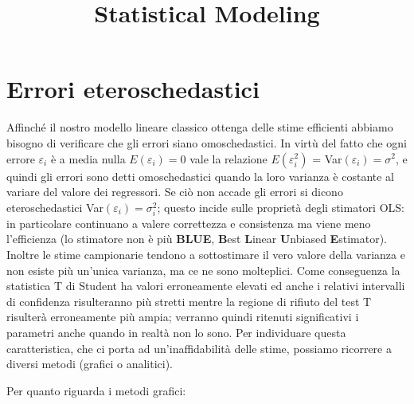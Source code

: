 \documentclass[a4page, 11pt]{article} %
\title{Statistical Modeling}
\author{}
\date{}
\begin{document}
\maketitle

\section{Errori eteroschedastici}
Affinché il nostro modello lineare classico ottenga delle stime efficienti abbiamo bisogno di verificare che gli errori siano omoschedastici. 
In virtù del fatto che ogni errore $\varepsilon_i$ è a media nulla $E(\varepsilon_i) = 0$ vale la relazione $E(\varepsilon_i^2)$ = Var$(\varepsilon_i) = \sigma^2$, e quindi gli errori sono detti omoschedastici quando la loro varianza è costante al variare del valore dei regressori.
Se ciò non accade gli errori si dicono eteroschedastici Var$(\varepsilon_i) = \sigma_i^2$; questo incide sulle proprietà degli stimatori OLS: in particolare continuano a valere correttezza e consistenza ma viene meno l’efficienza (lo stimatore non è più \textbf{BLUE}, \textbf{B}est \textbf{L}inear \textbf{U}nbiased \textbf{E}stimator). 
Inoltre le stime campionarie tendono a sottostimare il vero valore della varianza e non esiste più un’unica varianza, ma ce ne sono molteplici. 
Come conseguenza la statistica T di Student ha valori erroneamente elevati ed anche i relativi intervalli di confidenza risulteranno più stretti mentre la regione di rifiuto del test T risulterà erroneamente più ampia; verranno quindi ritenuti significativi i parametri anche quando in realtà non lo sono. 
Per individuare questa caratteristica, che ci porta ad un’inaffidabilità delle stime, possiamo ricorrere a diversi metodi (grafici o analitici).

Per quanto riguarda i metodi grafici:
\end{document}
